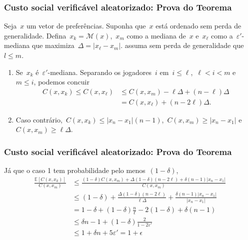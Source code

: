 \documentclass[usenames,dvipsnames]{beamer}
\begin{document}
\begin{frame}
\frametitle{Custo social verificável aleatorizado: Prova do Teorema}

Seja~$x$ um vetor de preferências. Suponha que~$x$ está ordenado sem perda de generalidade. Defina~$x_k = \mathcal{M}(x)$,~$x_m$ como a mediana de~$x$ e~$x_\ell$ como a~$\varepsilon'$-mediana que maximiza~$\Delta = |x_\ell - x_m|$. assuma sem perda de generalidade que~$l \leq m$.
 
\begin{enumerate}
\item Se~$x_k$ é~$\varepsilon'$-mediana. Separando os jogadores~$i$ em~$i \leq \ell$,~$\ell < i < m$ e~$m \leq i$, podemos concuir
\begin{align*} 
C(x,x_k) \leq C(x,x_\ell) & \leq C(x,x_m) - \ell \Delta + (n - \ell) \Delta \\
& = C(x,x_\ell) + (n-2\ell)\Delta \text{.}
\end{align*}
\item Caso contrário,~$C(x,x_k) \leq |x_n - x_1|(n-1)$,~$C(x,x_m) \geq |x_n - x_1|$ e~$C(x,x_m) \geq \ell \Delta$.
\end{enumerate}
\end{frame}

\begin{frame}
\frametitle{Custo social verificável aleatorizado: Prova do Teorema}

Já que o caso 1 tem probabilidade pelo menos~$(1 - \delta)$,
\begin{align*}
\frac{\mathbb{E}[C(x,x_k)]}{C(x,x_m)} & \leq \frac{(1-\delta)C(x,x_m) + \Delta(1-\delta)(n-2\ell) + \delta(n-1)|x_n - x_1|}{C(x,x_m)} \\
& \leq (1 - \delta) + \frac{\Delta(1-\delta)(n - 2\ell)}{\ell \Delta} + \frac{\delta(n-1)|x_n - x_1|}{|x_n - x_1|} \\
& = 1 - \delta + (1-\delta)\frac{n}{\ell} - 2(1-\delta) + \delta(n-1) \\
& \leq \delta n - 1 + (1 - \delta)\frac{2}{1 - 2\varepsilon'} \\
& \leq 1 + \delta n + 5 \varepsilon' = 1 + \epsilon
\end{align*}

\end{frame}
\end{document}
